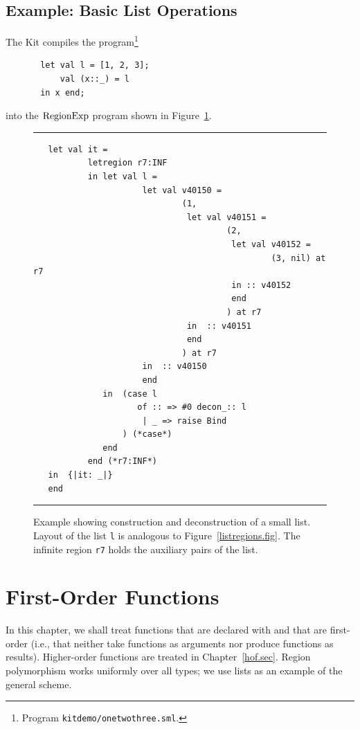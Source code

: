 \documentclass[12pt]{book}
\begin{document}
\section{Example: Basic List Operations}
\label{listexamples.sec}
The Kit compiles the program\footnote{Program \texttt{kitdemo/onetwothree.sml}.}  
\begin{verbatim}
       let val l = [1, 2, 3];
           val (x::_) = l
       in x end;
\end{verbatim}       
into the $\hbox{\rm RegionExp}$ program shown in Figure~\ref{listprint.fig}.
\begin{figure}
\hrule \medskip
\begin{verbatim}
   let val it = 
           letregion r7:INF 
           in let val l = 
                      let val v40150 = 
                              (1, 
                               let val v40151 = 
                                       (2, 
                                        let val v40152 = 
                                                (3, nil) at r7 
                                        in :: v40152 
                                        end 
                                       ) at r7
                               in  :: v40151
                               end 
                              ) at r7
                      in  :: v40150
                      end 
              in  (case l 
                     of :: => #0 decon_:: l 
                      | _ => raise Bind
                  ) (*case*) 
              end  
           end (*r7:INF*)
   in  {|it: _|}
   end 
\end{verbatim}
\caption{Example showing construction and deconstruction of a small list.
Layout of the list {\tt l} is analogous to Figure~\ref{listregions.fig}.
The infinite region {\tt r7} holds the auxiliary pairs of the list.
}
\label{listprint.fig}
\medskip

\hrule
\end{figure}

\chapter{First-Order Functions}
In this chapter, we shall treat functions that are declared with
 and that are first-order (i.e., that neither take functions
as arguments nor produce functions as results). Higher-order functions
are treated in Chapter~\ref{hof.sec}.
Region polymorphism works uniformly over all types; 
we use lists as an example of the general scheme. 
\end{document}
